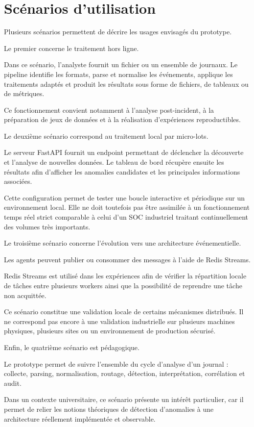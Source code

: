 \section{Scénarios d'utilisation}

Plusieurs scénarios permettent de décrire les usages envisagés du prototype.

Le premier concerne le traitement hors ligne.

Dans ce scénario, l'analyste fournit un fichier ou un ensemble de journaux. Le pipeline identifie les formats, parse et normalise les événements, applique les traitements adaptés et produit les résultats sous forme de fichiers, de tableaux ou de métriques.

Ce fonctionnement convient notamment à l'analyse post-incident, à la préparation de jeux de données et à la réalisation d'expériences reproductibles.

Le deuxième scénario correspond au traitement local par micro-lots.

Le serveur FastAPI fournit un endpoint permettant de déclencher la découverte et l'analyse de nouvelles données. Le tableau de bord récupère ensuite les résultats afin d'afficher les anomalies candidates et les principales informations associées.

Cette configuration permet de tester une boucle interactive et périodique sur un environnement local. Elle ne doit toutefois pas être assimilée à un fonctionnement temps réel strict comparable à celui d'un SOC industriel traitant continuellement des volumes très importants.

Le troisième scénario concerne l'évolution vers une architecture événementielle.

Les agents peuvent publier ou consommer des messages à l'aide de Redis Streams.

Redis Streams est utilisé dans les expériences afin de vérifier la répartition locale de tâches entre plusieurs workers ainsi que la possibilité de reprendre une tâche non acquittée.

Ce scénario constitue une validation locale de certains mécanismes distribués. Il ne correspond pas encore à une validation industrielle sur plusieurs machines physiques, plusieurs sites ou un environnement de production sécurisé.

Enfin, le quatrième scénario est pédagogique.

Le prototype permet de suivre l'ensemble du cycle d'analyse d'un journal : collecte, parsing, normalisation, routage, détection, interprétation, corrélation et audit.

Dans un contexte universitaire, ce scénario présente un intérêt particulier, car il permet de relier les notions théoriques de détection d'anomalies à une architecture réellement implémentée et observable.
